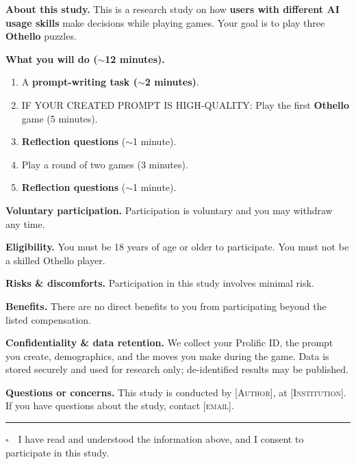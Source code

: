 %

\begin{tcolorbox}[
  breakable,
  enhanced,
  colback=gray!3,
  colframe=gray!55,
  boxrule=0.5pt,
  arc=2pt,
  left=8pt, right=8pt, top=8pt, bottom=8pt,
  title={\textbf{Informed Consent}},
  fonttitle=\bfseries,
  coltitle=black,
  colbacktitle=gray!18,
  label={box:consent}
]
\small
\setlength{\parskip}{4pt}
\setlength{\parindent}{0pt}

\textbf{About this study.}
This is a research study on how \textbf{users with different AI usage skills} make
decisions while playing games. Your goal is to play three \textbf{Othello} puzzles.

\textbf{What you will do ($\sim$12 minutes).}
\begin{enumerate}[leftmargin=1.4em,itemsep=1pt,topsep=2pt]
  \item A \textbf{prompt-writing task ($\sim$2 minutes)}.
  \item IF YOUR CREATED PROMPT IS HIGH-QUALITY: Play the first \textbf{Othello} game (5 minutes).
  \item \textbf{Reflection questions} ($\sim$1 minute).
  \item Play a round of two games (3 minutes).
  \item \textbf{Reflection questions} ($\sim$1 minute).
\end{enumerate}

\textbf{Voluntary participation.}
Participation is voluntary and you may withdraw any time.

\textbf{Eligibility.}
You must be 18 years of age or older to participate. You must not be a skilled
Othello player.

\textbf{Risks \& discomforts.}
Participation in this study involves minimal risk.

\textbf{Benefits.}
There are no direct benefits to you from participating beyond the listed
compensation.

\textbf{Confidentiality \& data retention.}
We collect your Prolific ID, the prompt you create, demographics, and the moves
you make during the game. Data is stored securely and used for research only;
de-identified results may be published.

\textbf{Questions or concerns.}
This study is conducted by \textsc{[Author]}, at \textsc{[Institution]}. If you have
questions about the study, contact \textsc{[email]}.

\medskip
\hrule
\medskip

$\square$~~I have read and understood the information above, and I consent to
participate in this study.

\medskip
{}

\end{tcolorbox}
